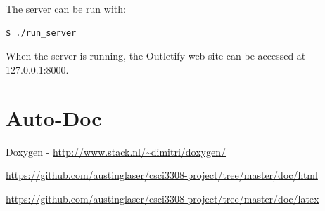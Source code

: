 \documentclass[]{article}
\begin{document}
The server can be run with:

\begin{lstlisting}[breaklines=true, frame=single]
$ ./run_server
\end{lstlisting}

When the server is running, the Outletify web site can be accessed at
127.0.0.1:8000.

\section{Auto-Doc}
Doxygen - \url{http://www.stack.nl/~dimitri/doxygen/}

\url{https://github.com/austinglaser/csci3308-project/tree/master/doc/html}

\url{https://github.com/austinglaser/csci3308-project/tree/master/doc/latex}
\end{document}
